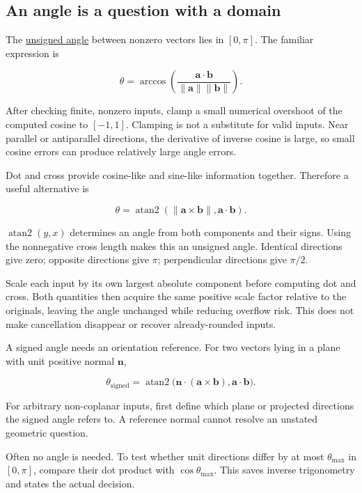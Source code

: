 \subsection{An angle is a question with a domain}\label{01-foundations-i-ch017-an-angle-is-a-question-with-a-domain}

The \hyperref[01-foundations-i-ch017-an-angle-is-a-question-with-a-domain]{unsigned angle} between nonzero vectors lies in \([0,\pi]\). The familiar expression is

\[
\theta=\arccos\left(
\frac{\mathbf a\cdot\mathbf b}{\|\mathbf a\|\|\mathbf b\|}
\right).
\]

After checking finite, nonzero inputs, clamp a small numerical overshoot of the computed cosine to \([-1,1]\). Clamping is not a substitute for valid inputs. Near parallel or antiparallel directions, the derivative of inverse cosine is large, so small cosine errors can produce relatively large angle errors.

Dot and cross provide cosine-like and sine-like information together. Therefore a useful alternative is

\[
\theta=\operatorname{atan2}
\left(\|\mathbf a\times\mathbf b\|,\mathbf a\cdot\mathbf b\right).
\]

\(\operatorname{atan2}(y,x)\) determines an angle from both components and their signs. Using the nonnegative cross length makes this an unsigned angle. Identical directions give zero; opposite directions give \(\pi\); perpendicular directions give \(\pi/2\).

Scale each input by its own largest absolute component before computing dot and cross. Both quantities then acquire the same positive scale factor relative to the originals, leaving the angle unchanged while reducing overflow risk. This does not make cancellation disappear or recover already-rounded inputs.

A signed angle needs an orientation reference. For two vectors lying in a plane with unit positive normal \(\mathbf n\),

\[
\theta_{\mathrm{signed}}=
\operatorname{atan2}\big(\mathbf n\cdot(\mathbf a\times\mathbf b),
\mathbf a\cdot\mathbf b\big).
\]

For arbitrary non-coplanar inputs, first define which plane or projected directions the signed angle refers to. A reference normal cannot resolve an unstated geometric question.

Often no angle is needed. To test whether unit directions differ by at most \(\theta_{\max}\) in \([0,\pi]\), compare their dot product with \(\cos\theta_{\max}\). This saves inverse trigonometry and states the actual decision.

